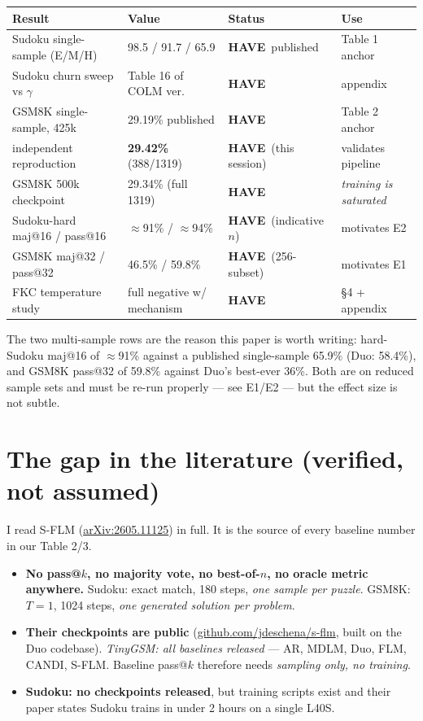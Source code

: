 \documentclass[11pt,a4paper]{article}
\newcommand{\have}{\textcolor{green!45!black}{\textbf{HAVE}}}
\begin{document}
\begin{center}\small
\begin{tabular}{@{}llll@{}}
\toprule
Result & Value & Status & Use \\ \midrule
Sudoku single-sample (E/M/H) & 98.5 / 91.7 / 65.9 & \have\ published & Table 1 anchor \\
Sudoku churn sweep vs $\gamma$ & Table 16 of COLM ver. & \have & appendix \\
GSM8K single-sample, 425k & 29.19\% published & \have & Table 2 anchor \\
\quad independent reproduction & \textbf{29.42\%} (388/1319) & \have\ (this session) & validates pipeline \\
GSM8K 500k checkpoint & 29.34\% (full 1319) & \have & \emph{training is saturated} \\
Sudoku-hard maj@16 / pass@16 & $\approx$91\% / $\approx$94\% & \have\ (indicative $n$) & motivates E2 \\
GSM8K maj@32 / pass@32 & 46.5\% / 59.8\% & \have\ (256-subset) & motivates E1 \\
FKC temperature study & full negative w/ mechanism & \have & \S4 + appendix \\
\bottomrule
\end{tabular}
\end{center}

\noindent The two multi-sample rows are the reason this paper is worth writing: hard-Sudoku
maj@16 of $\approx$91\% against a published single-sample 65.9\% (Duo: 58.4\%), and GSM8K
pass@32 of 59.8\% against Duo's best-ever 36\%. Both are on reduced sample sets and must be
re-run properly --- see E1/E2 --- but the effect size is not subtle.

\section{The gap in the literature (verified, not assumed)}

I read S-FLM (\href{https://arxiv.org/abs/2605.11125}{arXiv:2605.11125}) in full. It is the
source of every baseline number in our Table 2/3.

\begin{itemize}
\item \textbf{No pass@$k$, no majority vote, no best-of-$n$, no oracle metric anywhere.}
      Sudoku: exact match, 180 steps, \emph{one sample per puzzle}. GSM8K: $T{=}1$, 1024 steps,
      \emph{one generated solution per problem}.
\item \textbf{Their checkpoints are public} (\href{https://github.com/jdeschena/s-flm}{github.com/jdeschena/s-flm},
      built on the Duo codebase). \emph{TinyGSM: all baselines released} --- AR, MDLM, Duo, FLM,
      CANDI, S-FLM. Baseline pass@$k$ therefore needs \emph{sampling only, no training}.
\item \textbf{Sudoku: no checkpoints released}, but training scripts exist and their paper
      states Sudoku trains in under 2 hours on a single L40S.
\end{itemize}
\end{document}
